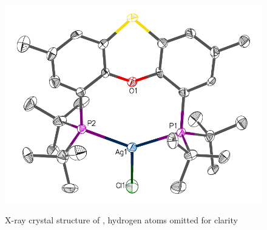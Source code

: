 \begin{figure}[hp]
\begin{center}
\vspace{0.5cm}
\includegraphics[scale=0.8]{../Figures/Crystalthixantphossilverchloride.pdf}
\caption[X-ray crystal structure of ]{X-ray crystal structure of , hydrogen atoms omitted for clarity}
\vspace{0.2cm}
\label{crystalthixantphossilverchloride}
\vspace{0.2cm}
\end{center}
\end{figure}
\vspace{0.2cm}

